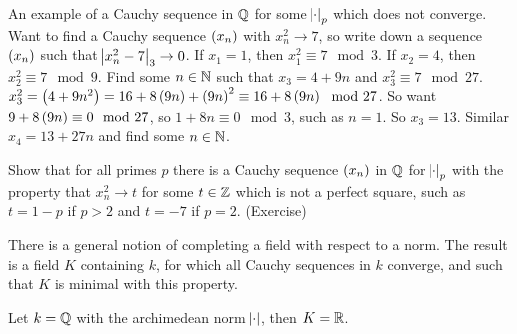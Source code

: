 \begin{example*}
An example of a Cauchy sequence in $ \mathbb{Q} $ for some $ \abs{\cdot}_p $ which does not converge. Want to find a Cauchy sequence $ \br{x_n} $ with $ x_n^2 \to 7 $, so write down a sequence $ \br{x_n} $ such that $ \abs{x_n^2 - 7}_3 \to 0 $. If $ x_1 = 1 $, then $ x_1^2 \equiv 7 \mod 3 $. If $ x_2 = 4 $, then $ x_2^2 \equiv 7 \mod 9 $. Find some $ n \in \mathbb{N} $ such that $ x_3 = 4 + 9n $ and $ x_3^2 \equiv 7 \mod 27 $. $ x_3^2 = \br{4 + 9n^2} = 16 + 8\br{9n} + \br{9n}^2 \equiv 16 + 8\br{9n} \mod 27 $. So want $ 9 + 8\br{9n} \equiv 0 \mod 27 $, so $ 1 + 8n \equiv 0 \mod 3 $, such as $ n = 1 $. So $ x_3 = 13 $. Similar $ x_4 = 13 + 27n $ and find some $ n \in \mathbb{N} $.
\end{example*}

\begin{example*}
Show that for all primes $ p $ there is a Cauchy sequence $ \br{x_n} $ in $ \mathbb{Q} $ for $ \abs{\cdot}_p $ with the property that $ x_n^2 \to t $ for some $ t \in \mathbb{Z} $ which is not a perfect square, such as $ t = 1 - p $ if $ p > 2 $ and $ t = -7 $ if $ p = 2 $. (Exercise)
\end{example*}

There is a general notion of completing a field with respect to a norm. The result is a field $ K $ containing $ k $, for which all Cauchy sequences in $ k $ converge, and such that $ K $ is minimal with this property.

\begin{example*}
Let $ k = \mathbb{Q} $ with the archimedean norm $ \abs{\cdot} $, then $ K = \mathbb{R} $.
\end{example*}


